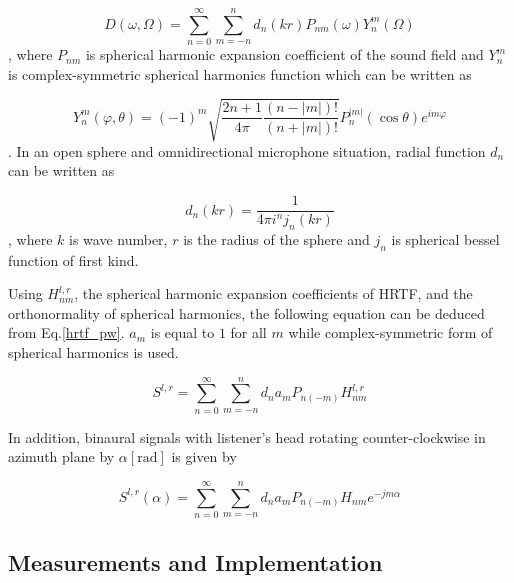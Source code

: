 \documentclass[convention,e-brief]{aesconf-current}
\begin{document}
\begin{equation}
    D\left(\omega, \Omega\right)=\sum_{n=0}^{\infty} \sum_{m=-n}^{n} d_{n}(k r) P_{n m}(\omega) Y_{n}^{m}\left(\Omega\right)
\end{equation}
, where $P_{nm}$ is spherical harmonic expansion coefficient of the sound field and $Y^{m}_n$ is complex-symmetric spherical harmonics function which can be written as

$$
    Y_{n}^{m}(\varphi, \theta) =(-1)^{m} \sqrt{\frac{2 n+1}{4 \pi} \frac{(n-|m|) !}{(n+|m|) !}} P_{n}^{|m|}(\cos \theta) e^{i m \varphi}
$$
.
In an open sphere and omnidirectional microphone situation, radial function $d_n$ can be written as

$$
    d_{n}(kr)=\frac{1}{4 \pi i^{n} j_{n}\left(k r\right)}
$$
, where $k$ is wave number, $r$ is the radius of the sphere and $j_n$ is spherical bessel function of first kind.

Using $H_{nm}^{l,r}$, the spherical harmonic expansion coefficients of HRTF, and the orthonormality of spherical harmonics, the following equation can be deduced from Eq.\ref{hrtf_pw}. $a_{m}$ is equal to $1$ for all $m$ while complex-symmetric form of spherical harmonics is used.

\begin{equation}
    \label{binaural_signal}
    S^{l, r} =\sum_{n=0}^{\infty} \sum_{m=-n}^{n} d_{n} a_{m} P_{n(-m)} H_{n m}^{l,r}
\end{equation}

In addition, binaural signals with listener's head rotating counter-clockwise in azimuth plane by $\alpha[\mathrm{rad}]$ is given by

\begin{equation}
    \label{rotation}
    S^{l, r}(\alpha)=\sum_{n=0}^{\infty} \sum_{m=-n}^{n} d_{n} a_{m} P_{n(-m)} H_{n m} e^{-j m \alpha}
\end{equation}

\subsection{Measurements and Implementation}
\end{document}
